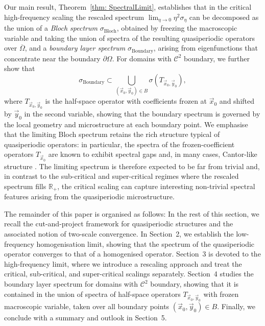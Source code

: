 \documentclass[a4paper,reqno]{amsart}
\numberwithin{equation}{section}
\numberwithin{equation}{section}		%
\numberwithin{figure}{section}			%
\numberwithin{table}{section}				%
\theoremstyle{definition}
\renewcommand{\bar}[1]{\overline{#1}}
\newcommand{\<}{\ensuremath \leq}
\renewcommand{\>}{\ensuremath \geq}
\begin{document}
Our main result, Theorem~\ref{thm: SpectralLimit}, establishes that in the critical high-frequency scaling the rescaled spectrum $\lim_{\eta\to 0}\eta^{2}\sigma_\eta$ can be decomposed as the union of a \emph{Bloch spectrum} $\sigma_{\text{Bloch}}$, obtained by freezing the macroscopic variable and taking the union of spectra of the resulting quasiperiodic operators over $\bar{\Omega}$, and a \emph{boundary layer spectrum} $\sigma_{\text{Boundary}}$, arising from eigenfunctions that concentrate near the boundary $\partial\Omega$. For domains with $\mathcal{C}^{2}$ boundary, we further show that
\begin{equation*}
    \sigma_{\text{Boundary}}\subset\bigcup_{(\vec{x}_0,\vec{y}_0)\in B}\sigma(T_{\vec{x}_0,\vec{y}_0}),
\end{equation*}
where $T_{\vec{x}_0,\vec{y}_0}$ is the half-space operator with coefficients frozen at $\vec{x}_0$ and shifted by $\vec{y}_0$ in the second variable, showing that the boundary spectrum is governed by the local geometry and microstructure at each boundary point. We emphasise that the limiting Bloch spectrum retains the rich structure typical of quasiperiodic operators: in particular, the spectra of the frozen-coefficient operators $T_{\vec{x}_0}$ are known to exhibit spectral gaps and, in many cases, Cantor-like structure \cite{Simon1982, avila2009ten}. The limiting spectrum is therefore expected to be far from trivial and, in contrast to the sub-critical and super-critical regimes where the rescaled spectrum fills $\mathbb{R}_+$, the critical scaling can capture interesting non-trivial spectral features arising from the quasiperiodic microstructure.

The remainder of this paper is organised as follows: In the rest of this section, we recall the cut-and-project framework for quasiperiodic structures and the associated notion of two-scale convergence. In Section~2, we establish the low-frequency homogenisation limit, showing that the spectrum of the quasiperiodic operator converges to that of a homogenised operator. Section~3 is devoted to the high-frequency limit, where we introduce a rescaling approach and treat the critical, sub-critical, and super-critical scalings separately. Section~4 studies the boundary layer spectrum for domains with $\mathcal{C}^{2}$ boundary, showing that it is contained in the union of spectra of half-space operators $T_{\vec{x}_0,\vec{y}_0}$ with frozen macroscopic variable, taken over all boundary points $(\vec{x}_0,\vec{y}_0) \in B$. Finally, we conclude with a summary and outlook in Section~5.
\end{document}
